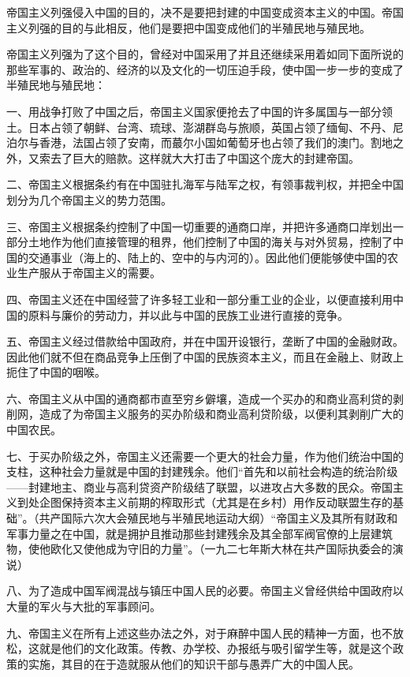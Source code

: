 \documentclass[UTF8, 12pt, a4paper]{ctexrep}
\begin{document}
帝国主义列强侵入中国的目的，决不是要把封建的中国变成资本主义的中国。帝国主义列强的目的与此相反，他们是要把中国变成他们的半殖民地与殖民地。

帝国主义列强为了这个目的，曾经对中国采用了并且还继续采用着如同下面所说的那些军事的、政治的、经济的以及文化的一切压迫手段，使中国一步一步的变成了半殖民地与殖民地：

一、用战争打败了中国之后，帝国主义国家便抢去了中国的许多属国与一部分领土。日本占领了朝鲜、台湾、琉球、澎湖群岛与旅顺，英国占领了缅甸、不丹、尼泊尔与香港，法国占领了安南，而蕞尔小国如葡萄牙也占领了我们的澳门。割地之外，又索去了巨大的赔款。这样就大大打击了中国这个庞大的封建帝国。

二、帝国主义根据条约有在中国驻扎海军与陆军之权，有领事裁判权，并把全中国划分为几个帝国主义的势力范围。

三、帝国主义根据条约控制了中国一切重要的通商口岸，并把许多通商口岸划出一部分土地作为他们直接管理的租界，他们控制了中国的海关与对外贸易，控制了中国的交通事业（海上的、陆上的、空中的与内河的）。因此他们便能够使中国的农业生产服从于帝国主义的需要。

四、帝国主义还在中国经营了许多轻工业和一部分重工业的企业，以便直接利用中国的原料与廉价的劳动力，并以此与中国的民族工业进行直接的竞争。

五、帝国主义经过借款给中国政府，并在中国开设银行，垄断了中国的金融财政。因此他们就不但在商品竞争上压倒了中国的民族资本主义，而且在金融上、财政上扼住了中国的咽喉。

六、帝国主义从中国的通商都市直至穷乡僻壤，造成一个买办的和商业高利贷的剥削网，造成了为帝国主义服务的买办阶级和商业高利贷阶级，以便利其剥削广大的中国农民。

七、于买办阶级之外，帝国主义还需要一个更大的社会力量，作为他们统治中国的支柱，这种社会力量就是中国的封建残余。他们“首先和以前社会构造的统治阶级——封建地主、商业与高利贷资产阶级结了联盟，以进攻占大多数的民众。帝国主义到处企图保持资本主义前期的榨取形式（尤其是在乡村）用作反动联盟生存的基础”。（共产国际六次大会殖民地与半殖民地运动大纲）“帝国主义及其所有财政和军事力量之在中国，就是拥护且推动那些封建残余及其全部军阀官僚的上层建筑物，使他欧化又使他成为守旧的力量”。（一九二七年斯大林在共产国际执委会的演说）

八、为了造成中国军阀混战与镇压中国人民的必要。帝国主义曾经供给中国政府以大量的军火与大批的军事顾问。

九、帝国主义在所有上述这些办法之外，对于麻醉中国人民的精神一方面，也不放松，这就是他们的文化政策。传教、办学校、办报纸与吸引留学生等，就是这个政策的实施，其目的在于造就服从他们的知识干部与愚弄广大的中国人民。
\end{document}
